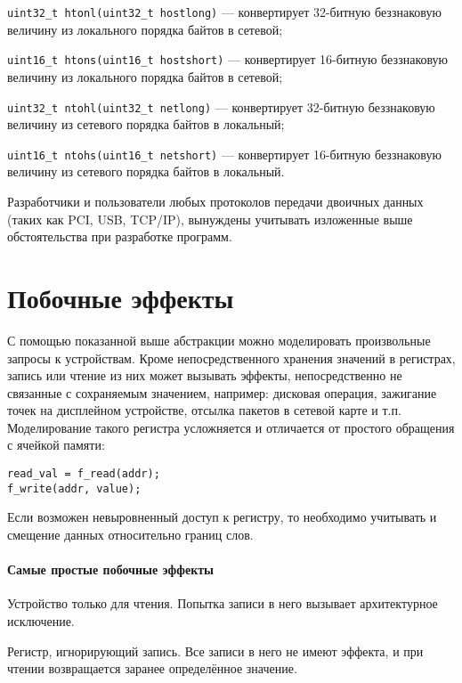 \begin{itemize*}
\item \texttt{uint32_t htonl(uint32_t hostlong)} — конвертирует 32-битную беззнаковую величину из локального порядка байтов в сетевой;
\item \texttt{uint16_t htons(uint16_t hostshort)} — конвертирует 16-битную беззнаковую величину из локального порядка байтов в сетевой;
\item \texttt{uint32_t ntohl(uint32_t netlong)} — конвертирует 32-битную беззнаковую величину из сетевого порядка байтов в локальный;
\item \texttt{uint16_t ntohs(uint16_t netshort)} — конвертирует 16-битную беззнаковую величину из сетевого порядка байтов в локальный.
\end{itemize*}

Разработчики и пользователи любых протоколов передачи двоичных данных (таких как PCI, USB, TCP/IP), вынуждены учитывать изложенные выше обстоятельства при разработке программ.

\section{Побочные эффекты}

С помощью показанной выше абстракции можно моделировать произвольные запросы к устройствам. Кроме непосредственного хранения значений в регистрах, запись или чтение из них может вызывать эффекты, непосредственно не связанные с сохраняемым значением, например: дисковая операция, зажигание точек на дисплейном устройстве, отсылка пакетов в сетевой карте и т.п. Моделирование такого регистра усложняется и отличается от простого обращения с ячейкой памяти:
\begin{lstlisting}
read_val = f_read(addr);
f_write(addr, value);    
\end{lstlisting}

Если возможен невыровненный доступ к регистру, то необходимо учитывать и смещение данных относительно границ слов. 

\paragraph{Самые простые побочные эффекты}
\begin{enumerate*}
\item Устройство только для чтения. Попытка записи в него вызывает архитектурное исключение.
\item Регистр, игнорирующий запись. Все записи в него не имеют эффекта, и при чтении возвращается заранее определённое значение.
\end{enumerate*}

